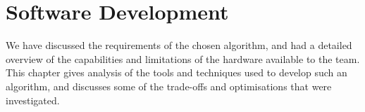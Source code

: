 \chapter{Software Development}\label{chap:software}

We have discussed the requirements of the chosen algorithm, and had a detailed overview of the capabilities and limitations of the hardware available to the team. This chapter gives analysis of the tools and techniques used to develop such an algorithm, and discusses some of the trade-offs and optimisations that were investigated.




